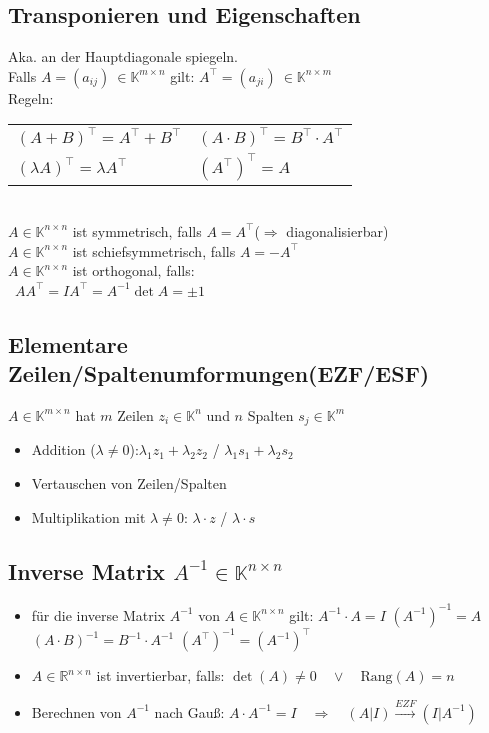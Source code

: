 \documentclass[6pt,a4paper]{scrartcl}
\newcommand{\K}{\ensuremath{\mathbb K}}
\begin{document}
\begin{multicols}{3}
\subsection{Transponieren und Eigenschaften}
Aka. an der Hauptdiagonale spiegeln.\\
Falls $A=(a_{ij})\ \in \mathbb K^{m\times n}$ gilt: $A^\top=(a_{ji})\ \in \K^{n\times m}$\\
Regeln:
\begin{tabular}{ll}
$(A+B)^\top=A^\top+B^\top$ & $(A\cdot B)^\top=B^\top\cdot A^\top$\qquad \\ $(\lambda A)^\top=\lambda A^\top$ & $(A^\top)^\top=A$\\
\end{tabular}
\\
$A\in \mathbb K^{n\times n}$ ist symmetrisch, falls $A=A^\top$\qquad ($\Rightarrow$ diagonalisierbar)\\
$A\in \mathbb K^{n\times n}$ ist schiefsymmetrisch, falls $A=-A^\top$\\
$A\in \mathbb K^{n\times n}$ ist orthogonal, falls:\\
\qquad\ $AA^\top=I$\qquad $A^\top=A^{-1}$\qquad $\det A=\pm 1$

\subsection{Elementare Zeilen/Spaltenumformungen(EZF/ESF)}
$A \in \mathbb K^{m\times n}$ hat $m$ Zeilen $z_i\in \mathbb K^n$ und $n$ Spalten $s_j\in \mathbb K^m$
\begin{itemize}\itemsep0pt
	\item Addition ($\lambda\ne 0$):\quad $\lambda_1 z_1 + \lambda_2  z_2$ \quad / \quad $\lambda_1  s_1 + \lambda_2 s_2$
	\item Vertauschen von Zeilen/Spalten
	\item Multiplikation mit $\lambda\ne 0$: \quad $\lambda \cdot z$ \quad  / \quad  $\lambda \cdot s$
\end{itemize}

\subsection{Inverse Matrix $A^{-1}\in \mathbb K^{n\times n}$}
\begin{itemize}\itemsep0pt
	\item für die inverse Matrix $A^{-1}$ von $A\in \mathbb K^{n\times n}$ gilt: $A^{-1}\cdot A=I$
	$(A^{-1})^{-1}=A$ \qquad $(A\cdot B)^{-1}=B^{-1}\cdot A^{-1}$ \qquad $(A^\top)^{-1}=(A^{-1})^\top$
	\item $A \in \mathbb R^{n\times n}$ ist invertierbar, falls: $\det (A) \ne 0 \quad \lor \quad \mathrm{Rang}(A)=n$
	\item Berechnen von $A^{-1}$ nach Gauß: $A\cdot A^{-1}=I\quad\Rightarrow\quad (A|I)\overset{EZF}{\longrightarrow}(I|A^{-1})$
\end{itemize}


\end{multicols}
\end{document}
